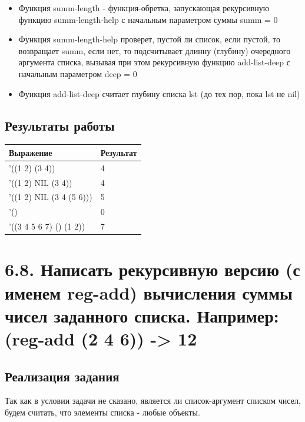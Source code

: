 \documentclass[a4paper,12pt]{article}
\begin{document}
 	\begin{itemize}
 		\item Функция summ-length - функция-обретка, запускающая рекурсивную функцию summ-length-help с начальным параметром суммы summ = 0
 		\item Функция summ-length-help проверет, пустой ли список, если пустой, то возвращает summ, если нет, то подсчитывает длинну (глубину) очередного аргумента списка, вызывая при этом рекурсивную функцию add-list-deep с начальным параметром deep = 0
 		\item Функция add-list-deep считает глубину списка lst (до тех пор, пока lst не nil)
 	\end{itemize}
 	
 	\subsection*{Результаты работы}
 	
 	 	\begin{table} [h!]
 		\begin{center}
 			\begin{tabular}{|l|l|}
 				\hline
 				{\bf  Выражение} & {\bf Результат} \\
 				\hline
 				{'((1 2) (3 4))} & 4\\
 				\hline
 				{'((1 2) NIL (3 4))} & 4\\
 				\hline
 				{'((1 2) NIL (3 4 (5 6)))} & 5\\
 				\hline
 				{'()} & 0 \\
 				\hline
 				{'((3 4 5 6 7) () (1 2))} & 7\\
 				\hline
 			\end{tabular}  
 			\label{m2}
 		\end{center}
 	\end{table}
 	
 	 \newpage
 	
 	\section*{6.8. Написать рекурсивную версию (с именем reg-add) вычисления суммы чисел
заданного списка.
Например: (reg-add (2 4 6)) -> 12
 	}
 	
 	\subsection*{Реализация задания}
 	
 	 	Так как в условии задачи не сказано, является ли список-аргумент списком чисел, будем считать, что элементы списка - любые объекты.
 	
\end{document}
